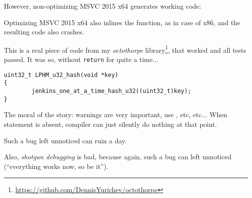 

However, non-optimizing MSVC 2015 x64 generates working code:



Optimizing MSVC 2015 x64 also inlines the function, as in case of x86, and the resulting code also crashes.

\myhrule{}

This is a real piece of code from my \emph{octothorpe} library\footnote{\url{https://github.com/DennisYurichev/octothorpe}}, that worked and all tests passed.
It was so, without \verb|return| for quite a time...

\begin{lstlisting}
uint32_t LPHM_u32_hash(void *key)
{
        jenkins_one_at_a_time_hash_u32((uint32_t)key);
}
\end{lstlisting}

\myhrule{}

The moral of the story: warnings are very important, use , etc, etc...
When  statement is absent, compiler can just silently do nothing at that point.

Such a bug left unnoticed can ruin a day.

Also, \emph{shotgun debugging}
is bad, because again, such a bug can left unnoticed (``everything works now, so be it'').

